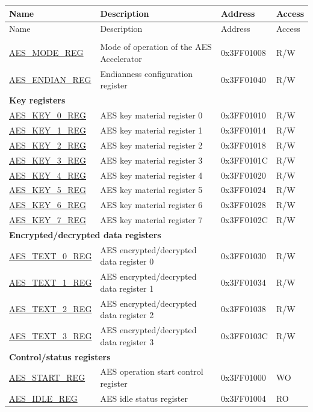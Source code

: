 \begin{longtable}{ | p{5cm} | p{7.5cm} | p{2cm} | p{1cm} | }
\hline\rowcolor{lightgray}
Name & Description &  Address & Access \\ \hline
\endfirsthead
        \hline
        \rowcolor{lightgray}
      Name & Description &  Address & Access \\
        \hline
        \endhead
        \endfoot
\multicolumn{4}{|l|}{\textbf{Configuration registers}} \\ \hline
\hyperref[regdesc:AESMODEREG]{AES\_MODE\_REG} & Mode of operation of the AES Accelerator & 0x3FF01008 & R/W \\ \hline
\hyperref[regdesc:AESENDIANREG]{AES\_ENDIAN\_REG} & Endianness configuration register & 0x3FF01040 & R/W \\ \hline
\multicolumn{4}{|l|}{\textbf{Key registers}} \\ \hline
\hyperref[regdesc:AESKEYnREG]{AES\_KEY\_0\_REG} & AES key material register 0 & 0x3FF01010 & R/W \\ \hline
\hyperref[regdesc:AESKEYnREG]{AES\_KEY\_1\_REG} & AES key material register 1 & 0x3FF01014 & R/W \\ \hline
\hyperref[regdesc:AESKEYnREG]{AES\_KEY\_2\_REG} & AES key material register 2 & 0x3FF01018 & R/W \\ \hline
\hyperref[regdesc:AESKEYnREG]{AES\_KEY\_3\_REG} & AES key material register 3 & 0x3FF0101C & R/W \\ \hline
\hyperref[regdesc:AESKEYnREG]{AES\_KEY\_4\_REG} & AES key material register 4 & 0x3FF01020 & R/W \\ \hline
\hyperref[regdesc:AESKEYnREG]{AES\_KEY\_5\_REG} & AES key material register 5 & 0x3FF01024 & R/W \\ \hline
\hyperref[regdesc:AESKEYnREG]{AES\_KEY\_6\_REG} & AES key material register 6 & 0x3FF01028 & R/W \\ \hline
\hyperref[regdesc:AESKEYnREG]{AES\_KEY\_7\_REG} & AES key material register 7 & 0x3FF0102C & R/W \\ \hline
\multicolumn{4}{|l|}{\textbf{Encrypted/decrypted data registers}} \\ \hline
\hyperref[regdesc:AESTEXTnREG]{AES\_TEXT\_0\_REG} & AES encrypted/decrypted data register 0 & 0x3FF01030 & R/W \\ \hline
\hyperref[regdesc:AESTEXTnREG]{AES\_TEXT\_1\_REG} & AES encrypted/decrypted data register 1 & 0x3FF01034 & R/W \\ \hline
\hyperref[regdesc:AESTEXTnREG]{AES\_TEXT\_2\_REG} & AES encrypted/decrypted data register 2 & 0x3FF01038 & R/W \\ \hline
\hyperref[regdesc:AESTEXTnREG]{AES\_TEXT\_3\_REG} & AES encrypted/decrypted data register 3 & 0x3FF0103C & R/W \\ \hline
\multicolumn{4}{|l|}{\textbf{Control/status registers}} \\ \hline
\hyperref[regdesc:AESSTARTREG]{AES\_START\_REG} & AES operation start control register & 0x3FF01000 & WO \\ \hline
\hyperref[regdesc:AESIDLEREG]{AES\_IDLE\_REG} & AES idle status register & 0x3FF01004 & RO \\ \hline
\end{longtable}
